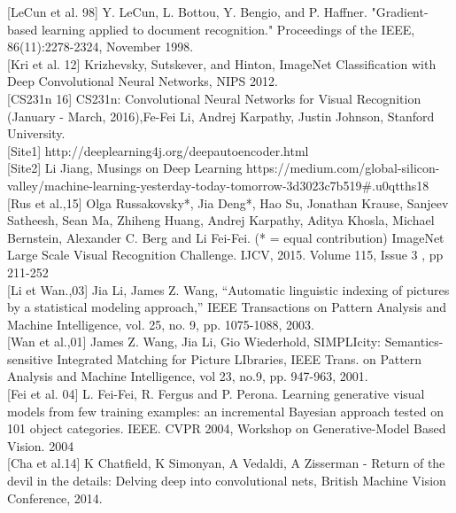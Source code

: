 [LeCun et al. 98] Y. LeCun, L. Bottou, Y. Bengio, and P. Haffner. "Gradient-based learning applied to document recognition." Proceedings of the IEEE, 86(11):2278-2324, November 1998. \\

[Kri et al. 12] Krizhevsky, Sutskever, and Hinton, ImageNet Classification with Deep Convolutional Neural Networks, NIPS 2012.\\

[CS231n 16] CS231n: Convolutional Neural Networks for Visual Recognition (January - March, 2016),Fe-Fei Li, Andrej Karpathy, Justin Johnson, Stanford University.\\

[Site1] http://deeplearning4j.org/deepautoencoder.html\\

[Site2] Li Jiang, Musings on Deep Learning https://medium.com/global-silicon-valley/machine-learning-yesterday-today-tomorrow-3d3023c7b519\#.u0qtths18\\


[Rus et al.,15] Olga Russakovsky*, Jia Deng*, Hao Su, Jonathan Krause, Sanjeev Satheesh, Sean Ma, Zhiheng Huang, Andrej Karpathy, Aditya Khosla, Michael Bernstein, Alexander C. Berg and Li Fei-Fei. (* = equal contribution) ImageNet Large Scale Visual Recognition Challenge. IJCV, 2015. Volume 115, Issue 3 , pp 211-252 \\

[Li et Wan.,03] Jia Li, James Z. Wang, ``Automatic linguistic indexing of pictures by a statistical modeling approach,'' IEEE Transactions on Pattern Analysis and Machine Intelligence, vol. 25, no. 9, pp. 1075-1088, 2003.\\

[Wan et al.,01] James Z. Wang, Jia Li, Gio Wiederhold, SIMPLIcity: Semantics-sensitive Integrated Matching for Picture LIbraries, IEEE Trans. on Pattern Analysis and Machine Intelligence, vol 23, no.9, pp. 947-963, 2001.\\

[Fei et al. 04] L. Fei-Fei, R. Fergus and P. Perona. Learning generative visual models from few training examples: an incremental Bayesian approach tested on 101 object categories. IEEE. CVPR 2004, Workshop on Generative-Model Based Vision. 2004\\

[Cha et al.14] K Chatfield, K Simonyan, A Vedaldi, A Zisserman - Return of the devil in the details: Delving deep into convolutional nets, British Machine Vision Conference, 2014.\\

